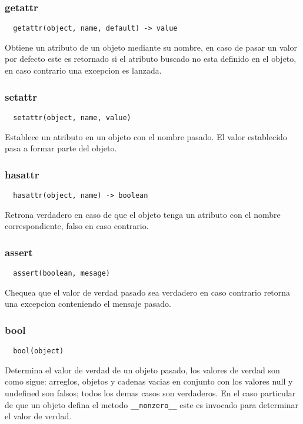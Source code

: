 \subsubsection*{getattr}
\begin{verbatim}
  getattr(object, name, default) -> value
\end{verbatim}
Obtiene un atributo de un objeto mediante su nombre, en caso de pasar un valor
por defecto este es retornado si el atributo buscado no esta definido en el
objeto, en caso contrario una excepcion es lanzada.

\subsubsection*{setattr}
\begin{verbatim}
  setattr(object, name, value)
\end{verbatim}
Establece un atributo en un objeto con el nombre pasado. El valor establecido
pasa a formar parte del objeto.

\subsubsection*{hasattr}
\begin{verbatim}
  hasattr(object, name) -> boolean
\end{verbatim}
Retrona verdadero en caso de que el objeto tenga un atributo con el nombre
correspondiente, falso en caso contrario.

\subsubsection*{assert}
\begin{verbatim}
  assert(boolean, mesage)
\end{verbatim}
Chequea que el valor de verdad pasado sea verdadero en caso contrario retorna
una excepcion conteniendo el mensaje pasado.

\subsubsection*{bool}
\begin{verbatim}
  bool(object)
\end{verbatim}
Determina el valor de verdad de un objeto pasado, los valores de verdad son como
sigue: arreglos, objetos y cadenas vacias en conjunto con los valores null y
undefined son falsos; todos los demas casos son verdaderos.
En el caso particular de que un objeto defina el metodo \verb|__nonzero__| este
es invocado para determinar el valor de verdad.


